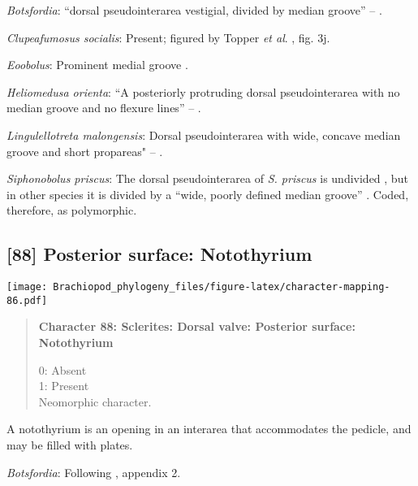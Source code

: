 \documentclass[openany]{book}
\theoremstyle{definition}
\theoremstyle{definition}
\theoremstyle{definition}
\theoremstyle{remark}
\begin{document}
\hypertarget{Botsfordia-coding-87}{}
\emph{Botsfordia}: ``dorsal pseudointerarea vestigial, divided by median
groove'' -- \citet{Williams2000LinguliformeaCraniiformea}.

\hypertarget{Clupeafumosus_socialis-coding-87}{}
\emph{Clupeafumosus socialis}: Present; figured by Topper \emph{et al}.
\citeyearpar{Topper2013Reappraisalof}, fig. 3j.

\hypertarget{Eoobolus-coding-87}{}
\emph{Eoobolus}: Prominent medial groove
\citep{Balthasar2009Thebrachiopod}.

\hypertarget{Heliomedusa_orienta-coding-87}{}
\emph{Heliomedusa orienta}: ``A posteriorly protruding dorsal
pseudointerarea with no median groove and no flexure lines'' --
\citet{Chen2007Reinterpretationof}.

\hypertarget{Lingulellotreta_malongensis-coding-87}{}
\emph{Lingulellotreta malongensis}: Dorsal pseudointerarea with wide,
concave median groove and short propareas" --
\citet{Williams2000LinguliformeaCraniiformea}.

\hypertarget{Siphonobolus_priscus-coding-87}{}
\emph{Siphonobolus priscus}: The dorsal pseudointerarea of \emph{S.
priscus} is undivided \citep{Popov2009Earlyontogeny}, but in other
species it is divided by a ``wide, poorly defined median groove''
\citep{Williams2000LinguliformeaCraniiformea}. Coded, therefore, as
polymorphic.

\subsection*{{[}88{]} Posterior surface:
Notothyrium}\label{posterior-surface-notothyrium}

\texttt{[image: Brachiopod\_phylogeny\_files/figure-latex/character-mapping-86.pdf]}

\begin{quote}
\textbf{Character 88: Sclerites: Dorsal valve: Posterior surface:
Notothyrium}

0: Absent\\
1: Present\\
Neomorphic character.
\end{quote}

A notothyrium is an opening in an interarea that accommodates the
pedicle, and may be filled with plates.

\hypertarget{Botsfordia-coding-88}{}
\emph{Botsfordia}: Following \citet{Williams1998Thediversity}, appendix
2.
\end{document}
